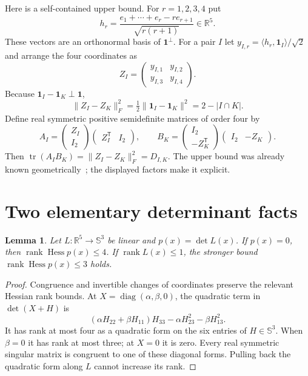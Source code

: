 \documentclass[11pt]{article}
\newtheorem{lemma}[theorem]{Lemma}
\newcommand{\tr}{\operatorname{tr}}
\newcommand{\rank}{\operatorname{rank}}
\newcommand{\Hess}{\operatorname{Hess}}
\begin{document}
Here is a self-contained upper bound. For $r=1,2,3,4$ put
\[
 h_r=\frac{e_1+\cdots+e_r-r e_{r+1}}{\sqrt{r(r+1)}}\in\mathbb R^5.
\]
These vectors are an orthonormal basis of $\mathbf1^\perp$. For a pair $I$ let $y_{I,r}=\langle h_r,\mathbf1_I\rangle/\sqrt2$ and arrange the four coordinates as
\[
 Z_I=\begin{pmatrix}y_{I,1}&y_{I,2}\\y_{I,3}&y_{I,4}\end{pmatrix}.
\]
Because $\mathbf1_I-\mathbf1_K\perp\mathbf1$,
\[
 \|Z_I-Z_K\|_F^2=\tfrac12\|\mathbf1_I-\mathbf1_K\|^2=2-|I\cap K|.
\]
Define real symmetric positive semidefinite matrices of order four by
\[
 A_I=\begin{pmatrix}Z_I\\I_2\end{pmatrix}
       \begin{pmatrix}Z_I^{\mathsf T}&I_2\end{pmatrix},\qquad
 B_K=\begin{pmatrix}I_2\\-Z_K^{\mathsf T}\end{pmatrix}
       \begin{pmatrix}I_2&-Z_K\end{pmatrix}.
\]
Then $\tr(A_IB_K)=\|Z_I-Z_K\|_F^2=D_{I,K}$. The upper bound was already known geometrically~\cite{fgprt}; the displayed factors make it explicit.

\section{Two elementary determinant facts}
\begin{lemma}\label{lem:hessian}
Let $L:\mathbb R^5\to\mathbb S^3$ be linear and $p(x)=\det L(x)$. If $p(x)=0$, then $\rank\Hess p(x)\leq4$. If $\rank L(x)\leq1$, the stronger bound $\rank\Hess p(x)\leq3$ holds.
\end{lemma}
\begin{proof}
Congruence and invertible changes of coordinates preserve the relevant Hessian rank bounds. At $X=\operatorname{diag}(\alpha,\beta,0)$, the quadratic term in $\det(X+H)$ is
\[
 (\alpha H_{22}+\beta H_{11})H_{33}
       -\alpha H_{23}^2-\beta H_{13}^2.
\]
It has rank at most four as a quadratic form on the six entries of $H\in\mathbb S^3$. When $\beta=0$ it has rank at most three; at $X=0$ it is zero. Every real symmetric singular matrix is congruent to one of these diagonal forms. Pulling back the quadratic form along $L$ cannot increase its rank.
\end{proof}
\end{document}
